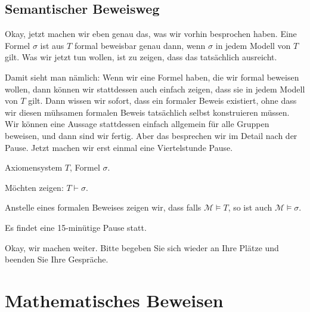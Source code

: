 \subsection{Semantischer Beweisweg}
\begin{spoken-clean}[00:37:10 - 00:40:05]
Okay, jetzt machen wir eben genau das, was wir vorhin besprochen haben. Eine Formel $\sigma$ ist aus $T$ formal beweisbar genau dann, wenn $\sigma$ in jedem Modell von $T$ gilt. Was wir jetzt tun wollen, ist zu zeigen, dass das tatsächlich ausreicht.

Damit sieht man nämlich: Wenn wir eine Formel haben, die wir formal beweisen wollen, dann können wir stattdessen auch einfach zeigen, dass sie in jedem Modell von $T$ gilt. Dann wissen wir sofort, dass ein formaler Beweis existiert, ohne dass wir diesen mühsamen formalen Beweis tatsächlich selbst konstruieren müssen. Wir können eine Aussage stattdessen einfach allgemein für alle Gruppen beweisen, und dann sind wir fertig. Aber das besprechen wir im Detail nach der Pause. Jetzt machen wir erst einmal eine Viertelstunde Pause.
\end{spoken-clean}

\begin{math-stroke}
Axiomensystem $T$, Formel $\sigma$.

Möchten zeigen: $T \vdash \sigma$.

Anstelle eines formalen Beweises zeigen wir, dass falls $\mathcal{M} \models T$, so ist auch $\mathcal{M} \models \sigma$.
\end{math-stroke}

\begin{lecture-break}[Pause]
Es findet eine 15-minütige Pause statt.
\end{lecture-break}

\begin{spoken-clean}[00:45:10 - 00:47:10]
Okay, wir machen weiter. Bitte begeben Sie sich wieder an Ihre Plätze und beenden Sie Ihre Gespräche.
\end{spoken-clean}

\section{Mathematisches Beweisen}

